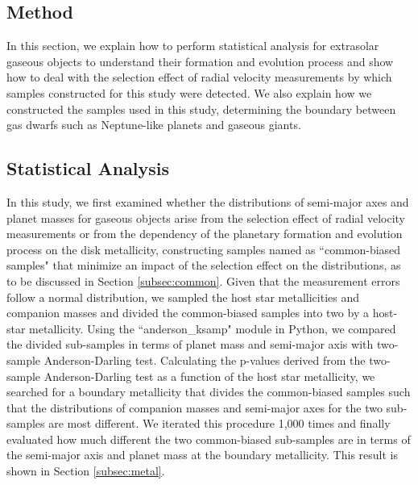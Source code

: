 \documentclass[twocolumn, dvipdfmx]{aastex62}
\begin{document}
\begin{CJK*}{UTF8}{min}
\section{Method} \label{sec:method}

In this section, we explain how to perform statistical analysis for extrasolar gaseous objects to understand their formation and evolution process and show how to deal with the selection effect of radial velocity measurements by which samples constructed for this study were detected. We also explain how we constructed the samples used in this study, determining the boundary between gas dwarfs such as Neptune-like planets and gaseous giants.


\subsection{Statistical Analysis} \label{subsec:analysis}

In this study, we first examined whether the distributions of semi-major axes and planet masses for gaseous objects arise from the selection effect of radial velocity measurements or from the dependency of the planetary formation and evolution process on the disk metallicity, constructing samples named as ``common-biased samples" that minimize an impact of the selection effect on the distributions, as to be discussed in Section \ref{subsec:common}. Given that the measurement errors follow a normal distribution, we sampled the host star metallicities and companion masses and divided the common-biased samples into two by a host-star metallicity. Using the ``anderson\_ksamp" module in Python, we compared the divided sub-samples in terms of planet mass and semi-major axis with two-sample Anderson-Darling test. Calculating the p-values derived from the two-sample Anderson-Darling test as a function of the host star metallicity, we searched for a boundary metallicity that divides the common-biased samples such that the distributions of companion masses and semi-major axes for the two sub-samples are most different. We iterated this procedure 1,000 times and finally evaluated how much different the two common-biased sub-samples are in terms of the semi-major axis and planet mass at the boundary metallicity. This result is shown in Section \ref{subsec:metal}.


\end{CJK*}
\end{document}
